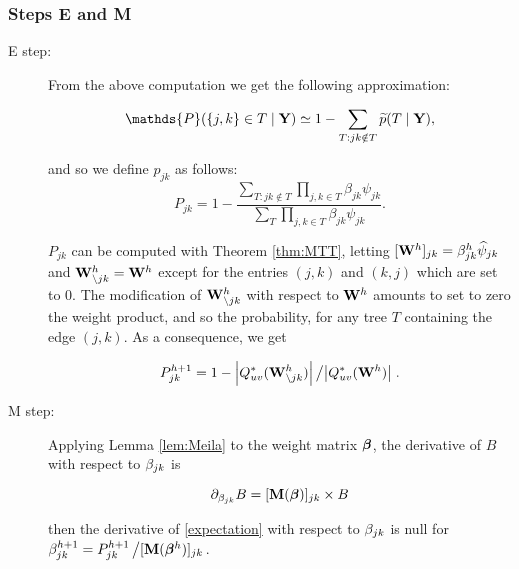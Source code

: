 \subsubsection*{Steps E and M}
\begin{description}
 \item[E step:]
From the above computation we get the following approximation:
 
 
$$\mathds{P}(\{j,k\}\in T  \mid \Yb) \simeq 1 - \sum_{T:jk\notin T} \pt(T \mid \Yb),$$
 
and so we define $p_{jk}$ as follows:  
$$P_{jk}= 1 - \frac{\sum_{T:jk\notin T} \prod_{j, k \in T} \beta_{jk} \psi_{jk}}{\sum_T \prod_{j, k \in T} \beta_{jk} \psi_{jk}}.$$
 
 $P_{jk}$ can be computed with Theorem \ref{thm:MTT}, letting $[{\bf W}^h]_{jk} = \beta^h_{jk} \widehat{\psi}_{jk}$ and ${\bf W}^h_{\setminus {jk}} = {\bf W}^h$ except for the entries $(j, k)$ and $(k, j)$ which are set to 0. The modification of ${\bf W}^h_{\setminus {jk}}$ with respect to ${\bf W}^h$ amounts to set to zero the weight product, and so the probability, for any tree $T$ containing the edge $(j, k)$. As a consequence, we get
 
$$
 P^{h+1}_{jk} = 1 - \left|Q_{uv}^*({\bf W}^h_{\setminus {jk}})\right| \left/ \left|Q_{uv}^*({\bf W}^h)\right| \right..
 $$
 
 \item[M step:] Applying Lemma \ref{lem:Meila} to the weight matrix ${\boldsymbol{\beta}}$, the derivative of $B$ with respect to $\beta_{jk}$ is 
 
$$
 \partial_{\beta_{jk}} B = [{\bf M}({\boldsymbol{\beta}})]_{jk} \times B
 $$
 
 then the derivative of \eqref{expectation} with respect to $\beta_{jk}$ is null for
 $\beta^{h+1}_{jk} = P_{jk}^{h+1} \left/ [{\bf M}({\boldsymbol{\beta}}^h)]_{jk} \right.$.
 \end{description}
